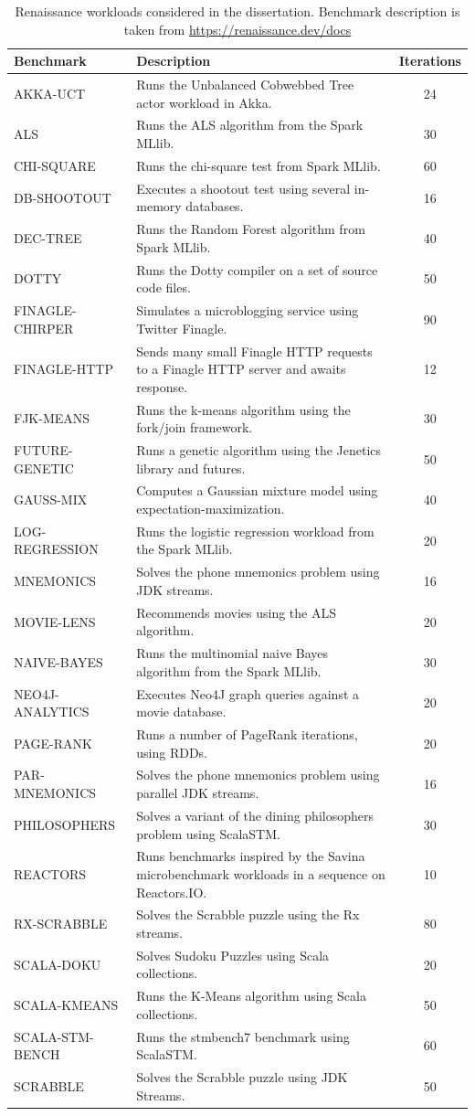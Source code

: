\documentclass[]{usiinfthesis}
\begin{document}
\begin{table}
\centering
\caption{Renaissance workloads considered in the dissertation. Benchmark description is taken from \url{https://renaissance.dev/docs}}
\begin{tabularx}{\textwidth}{|l|X|c|}
\hline
Benchmark&Description&Iterations\\
\hline
AKKA-UCT&Runs the Unbalanced Cobwebbed Tree actor workload in Akka.&24\\
ALS&Runs the ALS algorithm from the Spark MLlib.&30\\
CHI-SQUARE&Runs the chi-square test from Spark MLlib.&60\\
DB-SHOOTOUT&Executes a shootout test using several in-memory databases.&16\\
DEC-TREE&Runs the Random Forest algorithm from Spark MLlib.&40\\
DOTTY&Runs the Dotty compiler on a set of source code files.&50\\
FINAGLE-CHIRPER&Simulates a microblogging service using Twitter Finagle.&90\\
FINAGLE-HTTP&Sends many small Finagle HTTP requests to a Finagle HTTP server and awaits response.&12\\
FJK-MEANS&Runs the k-means algorithm using the fork/join framework.&30\\
FUTURE-GENETIC&Runs a genetic algorithm using the Jenetics library and futures.&50\\
GAUSS-MIX&Computes a Gaussian mixture model using expectation-maximization.&40\\
LOG-REGRESSION&Runs the logistic regression workload from the Spark MLlib.&20\\
MNEMONICS&Solves the phone mnemonics problem using JDK streams.&16\\
MOVIE-LENS&Recommends movies using the ALS algorithm.&20\\
NAIVE-BAYES&Runs the multinomial naive Bayes algorithm from the Spark MLlib.&30\\
NEO4J-ANALYTICS&Executes Neo4J graph queries against a movie database.&20\\
PAGE-RANK&Runs a number of PageRank iterations, using RDDs.&20\\
PAR-MNEMONICS&Solves the phone mnemonics problem using parallel JDK streams.&16\\
PHILOSOPHERS&Solves a variant of the dining philosophers problem using ScalaSTM.&30\\
REACTORS	&Runs benchmarks inspired by the Savina microbenchmark workloads in a sequence on Reactors.IO.	&10	\\
RX-SCRABBLE	&Solves the Scrabble puzzle using the Rx streams.	&80	\\
SCALA-DOKU	&Solves Sudoku Puzzles using Scala collections.	&20	\\
SCALA-KMEANS	&Runs the K-Means algorithm using Scala collections. 	&50	\\
SCALA-STM-BENCH	&Runs the stmbench7 benchmark using ScalaSTM.	&60	\\
SCRABBLE	&Solves the Scrabble puzzle using JDK Streams.	&50	\\
\hline
\end{tabularx}
\end{table}%
\end{document}
